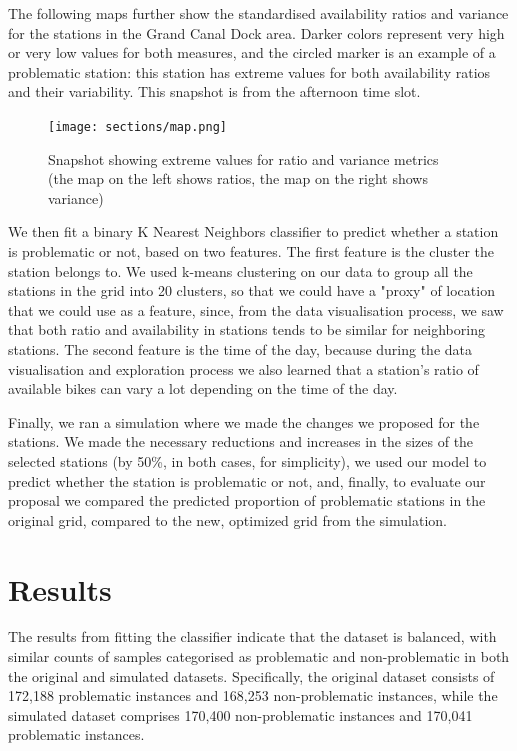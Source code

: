 The following maps further show the standardised availability ratios and variance for the stations in the Grand Canal Dock area. Darker colors represent very high or very low values for both measures, and the circled marker is an example of a problematic station: this station has extreme values for both availability ratios and their variability. This snapshot is from the afternoon time slot. 

\begin{figure}[h]
    \centering
    \caption{Snapshot showing extreme values for ratio and variance metrics \\ (the map on the left shows ratios, the map on the right shows variance)}
    \texttt{[image: sections/map.png]}
    \label{fig:example}
\end{figure}

\newpage
\noindent We then fit a binary K Nearest Neighbors classifier to predict whether a station is problematic or not, based on two features. The first feature is the cluster the station belongs to. We used k-means clustering on our data to group all the stations in the grid into 20 clusters, so that we could have a "proxy" of location that we could use as a feature, since, from the data visualisation process, we saw that both ratio and availability in stations tends to be similar for neighboring stations. The second feature is the time of the day, because during the data visualisation and exploration process we also learned that a station's ratio of available bikes can vary a lot depending on the time of the day. 

\vspace{0.3cm}
\noindent Finally, we ran a simulation where we made the changes we proposed for the stations. We made the necessary reductions and increases in the sizes of the selected stations (by 50\%, in both cases, for simplicity), we used our model to predict whether the station is problematic or not, and, finally, to evaluate our proposal we compared the predicted proportion of problematic stations in the original grid, compared to the new, optimized grid from the simulation. 

\vspace{-0.5cm}
\section{Results}
\vspace{-0.5cm}

\noindent The results from fitting the classifier indicate that the dataset is balanced, with similar counts of samples categorised as problematic and non-problematic in both the original and simulated datasets. Specifically, the original dataset consists of 172,188 problematic instances and 168,253 non-problematic instances, while the simulated dataset comprises 170,400 non-problematic instances and 170,041 problematic instances.

